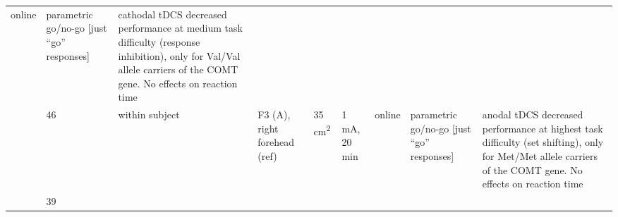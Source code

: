 \documentclass[11pt,english,]{memoir}
\begin{document}
\begin{longtable}[]{@{}lllllllll@{}}
\begin{minipage}[t]{0.06\columnwidth}
online\strut
\end{minipage} & \begin{minipage}[t]{0.11\columnwidth}\raggedright
parametric go/no-go {[}just
``go'' responses{]}\strut
\end{minipage} & \begin{minipage}[t]{0.24\columnwidth}\raggedright
cathodal tDCS decreased performance at medium task
difficulty (response inhibition), only for Val/Val
allele carriers of the COMT gene. No effects on
reaction time\strut
\end{minipage}\tabularnewline
\begin{minipage}[t]{0.08\columnwidth}\raggedright
\textcite{Plewnia2013}\strut
\end{minipage} & \begin{minipage}[t]{0.02\columnwidth}\raggedright
46\strut
\end{minipage} & \begin{minipage}[t]{0.04\columnwidth}\raggedright
within
subject\strut
\end{minipage} & \begin{minipage}[t]{0.13\columnwidth}\raggedright
F3 (A), right forehead (ref)\strut
\end{minipage} & \begin{minipage}[t]{0.03\columnwidth}\raggedright
35
cm\textsuperscript{2}\strut
\end{minipage} & \begin{minipage}[t]{0.05\columnwidth}\raggedright
1 mA, 20
min\strut
\end{minipage} & \begin{minipage}[t]{0.06\columnwidth}\raggedright
online\strut
\end{minipage} & \begin{minipage}[t]{0.11\columnwidth}\raggedright
parametric go/no-go {[}just
``go'' responses{]}\strut
\end{minipage} & \begin{minipage}[t]{0.24\columnwidth}\raggedright
anodal tDCS decreased performance at highest task
difficulty (set shifting), only for Met/Met allele
carriers of the COMT gene. No effects on reaction time\strut
\end{minipage}\tabularnewline
\begin{minipage}[t]{0.08\columnwidth}\raggedright
\textcite{Hsu2015}\strut
\end{minipage} & \begin{minipage}[t]{0.02\columnwidth}\raggedright
39\strut
\end{minipage} & \begin{minipage}[t]{0.04\columnwidth}\raggedright

\end{minipage}
\end{longtable}
\end{document}
